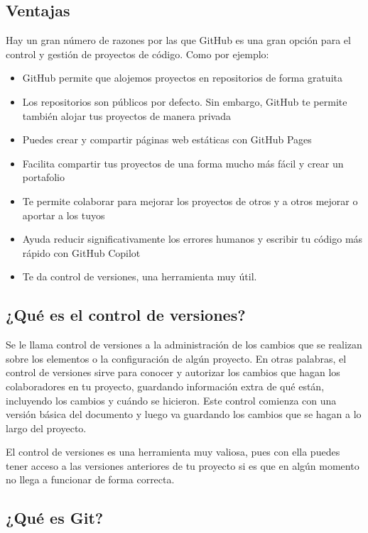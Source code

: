 \documentclass[paper=a4, fontsize=9pt]{article}
\begin{document}
\subsection{Ventajas}

Hay un gran número de razones por las que GitHub es una gran opción para el control y gestión de proyectos de código. Como por ejemplo:

\begin{itemize}

   \item GitHub permite que alojemos proyectos en repositorios de forma gratuita
   \item Los repositorios son públicos por defecto. Sin embargo, GitHub te permite también alojar tus proyectos de manera privada
   \item Puedes crear y compartir páginas web estáticas con GitHub Pages
   \item Facilita compartir tus proyectos de una forma mucho más fácil y crear un portafolio
   \item Te permite colaborar para mejorar los proyectos de otros y a otros mejorar o aportar a los tuyos
   \item Ayuda reducir significativamente los errores humanos y escribir tu código más rápido con GitHub Copilot
   \item Te da control de versiones, una herramienta muy útil.

\end{itemize}

\subsection{¿Qué es el control de versiones?}

Se le llama control de versiones a la administración de los cambios que se realizan sobre los elementos o la configuración de algún proyecto. En otras palabras, el control de versiones sirve para conocer y autorizar los cambios que hagan los colaboradores en tu proyecto, guardando información extra de qué están, incluyendo los cambios y cuándo se hicieron. Este control comienza con una versión básica del documento y luego va guardando los cambios que se hagan a lo largo del proyecto.

El control de versiones es una herramienta muy valiosa, pues con ella puedes tener acceso a las versiones anteriores de tu proyecto si es que en algún momento no llega a funcionar de forma correcta.

\subsection{¿Qué es Git?}
\end{document}
